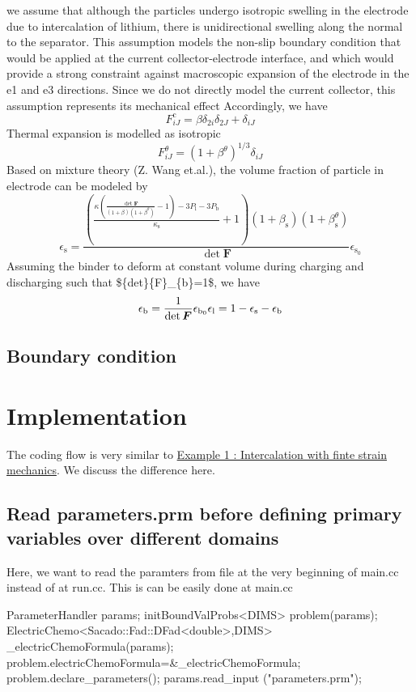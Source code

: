 we assume that although the particles undergo isotropic swelling in the electrode due to intercalation of lithium, there is unidirectional swelling along the normal to the separator. This assumption models the non-\/slip boundary condition that would be applied at the current collector-\/electrode interface, and which would provide a strong constraint against macroscopic expansion of the electrode in the e1 and e3 directions. Since we do not directly model the current collector, this assumption represents its mechanical effect Accordingly, we have \[ F^\text{c}_{iJ}=\beta\delta_{2i}\delta_{2J}+\delta_{iJ} \] Thermal expansion is modelled as isotropic \[ F^{\theta}_{iJ}=(1+\beta^{\theta})^{1/3}\delta_{iJ} \] Based on mixture theory (Z. Wang et.\-al.), the volume fraction of particle in electrode can be modeled by \[ \epsilon_\text{s}=\frac{\left( \frac{\kappa(\frac{\det\boldsymbol{F}}{(1+\beta)(1+\beta^\theta)}-1)-3P_\text{l}-3P_\text{b}}{\kappa_\text{s}} +1\right)(1+\beta_\text{s})(1+\beta_\text{s}^\theta)}{\det\boldsymbol{F}}\epsilon_{\text{s}_0} \] Assuming the binder to deform at constant volume during charging and discharging such that \$\{det\}\{F\}\-\_\-\{b\}=1\$, we have \[ \epsilon_\text{b}=\frac{1}{\det \boldsymbol{F}}\epsilon_{\text{b}_0}\\ \epsilon_\text{l}=1-\epsilon_{\text{s}}-\epsilon_\text{b} \] \hypertarget{battery_electrode_scale_sub2}{}\subsection{Boundary condition}\label{battery_electrode_scale_sub2}
 \hypertarget{battery_particle_Implementation}{}\section{Implementation}\label{battery_particle_Implementation}
The coding flow is very similar to \hyperlink{_intercalation}{Example 1 \-: Intercalation with finte strain mechanics}. We discuss the difference here.\hypertarget{battery_electrode_scale_sub1}{}\subsection{Read parameters.\-prm before defining primary variables over different domains}\label{battery_electrode_scale_sub1}
Here, we want to read the paramters from file at the very beginning of main.\-cc instead of at run.\-cc. This is can be easily done at main.\-cc 
\begin{DoxyCode}
ParameterHandler params;
initBoundValProbs<DIMS> problem(params);
ElectricChemo<Sacado::Fad::DFad<double>,DIMS> \_electricChemoFormula(params);
problem.electricChemoFormula=&\_electricChemoFormula;
problem.declare\_parameters();
params.read\_input (\textcolor{stringliteral}{"parameters.prm"});
\end{DoxyCode}

